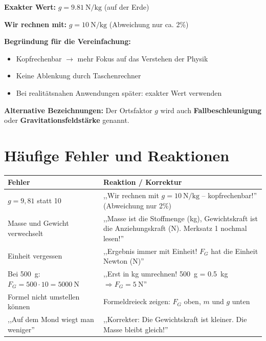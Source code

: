 \documentclass[a4paper,11pt]{article}
\begin{document}
\begin{tcolorbox}[colback=hinweis!10,colframe=hinweis,title=Ortsfaktor / Fallbeschleunigung / Gravitationsfeldstärke]
\textbf{Exakter Wert:} $g = \SI{9,81}{\newton\per\kilogram}$ (auf der Erde)

\textbf{Wir rechnen mit:} $g = \SI{10}{\newton\per\kilogram}$ (Abweichung nur ca. 2\%)

\vspace{2mm}
\textbf{Begründung für die Vereinfachung:}
\begin{itemize}[nosep]
    \item Kopfrechenbar $\rightarrow$ mehr Fokus auf das Verstehen der Physik
    \item Keine Ablenkung durch Taschenrechner
    \item Bei realitätsnahen Anwendungen später: exakter Wert verwenden
\end{itemize}

\vspace{2mm}
\textbf{Alternative Bezeichnungen:} Der Ortsfaktor $g$ wird auch \textbf{Fallbeschleunigung} oder \textbf{Gravitationsfeldstärke} genannt.
\end{tcolorbox}

\vspace{5mm}


\section*{Häufige Fehler und Reaktionen}

\begin{tabularx}{\textwidth}{|X|X|}
\hline
\textbf{Fehler} & \textbf{Reaktion / Korrektur} \\
\hline
$g = 9{,}81$ statt 10 & ,,Wir rechnen mit $g = \SI{10}{\newton\per\kilogram}$ -- kopfrechenbar!'' (Abweichung nur 2\%) \\
\hline
Masse und Gewicht verwechselt & ,,Masse ist die Stoffmenge (\si{\kilogram}), Gewichtskraft ist die Anziehungskraft (\si{\newton}). Merksatz 1 nochmal lesen!'' \\
\hline
Einheit vergessen & ,,Ergebnis immer mit Einheit! $F_G$ hat die Einheit Newton (\si{\newton})'' \\
\hline
Bei \SI{500}{\gram}: $F_G = 500 \cdot 10 = \SI{5000}{\newton}$ & ,,Erst in \si{\kilogram} umrechnen! \SI{500}{\gram} = \SI{0,5}{\kilogram} $\Rightarrow F_G = \SI{5}{\newton}$'' \\
\hline
Formel nicht umstellen können & Formeldreieck zeigen: $F_G$ oben, $m$ und $g$ unten \\
\hline
,,Auf dem Mond wiegt man weniger'' & ,,Korrekter: Die Gewichtskraft ist kleiner. Die Masse bleibt gleich!'' \\
\hline
\end{tabularx}
\end{document}
